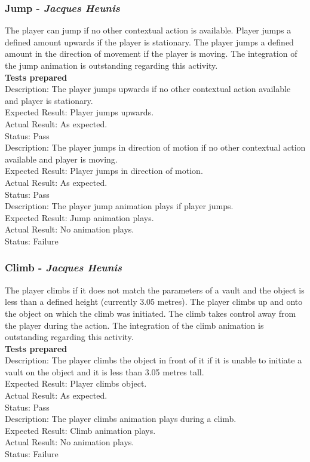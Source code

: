\documentclass[a4paper,10pt]{article}
\begin{document}
\subsubsection{Jump - \textit{Jacques Heunis}}
The player can jump if no other contextual action is available. Player jumps a defined amount upwards if the player is stationary. The player jumps a defined amount in the direction of movement if the player is moving. The integration of the  jump animation is outstanding regarding this activity.
\smallskip\\\textbf{Tests prepared}\\
Description: The player jumps upwards if no other contextual action available and player is stationary. \\
Expected Result: Player jumps upwards.\\
Actual Result:  As expected.\\
Status: Pass
\smallskip\\
Description: The player jumps in direction of motion if no other contextual action available and player is moving. \\
Expected Result: Player jumps in direction of motion.\\
Actual Result: As expected.\\
Status: Pass
\smallskip\\
Description: The player jump animation plays if player jumps. \\
Expected Result: Jump animation plays.\\
Actual Result:  No animation plays.\\
Status: Failure
\subsubsection{Climb - \textit{Jacques Heunis}}
The player climbs if it does not match the parameters of a vault and the object is less than a defined height (currently 3.05 metres). The player climbs up and onto the object on which the climb was initiated. The climb takes control away from the player during the action. The integration of the climb animation is outstanding regarding this activity.\smallskip\\\textbf{Tests prepared}\\
Description: The player climbs the object in front of it if it is unable to initiate a vault on the object and it is less than 3.05 metres tall. \\
Expected Result: Player climbs object.\\
Actual Result: As expected.\\
Status: Pass
\smallskip\\
Description: The player climbs animation plays during a climb. \\
Expected Result: Climb animation plays.\\
Actual Result:  No animation plays.\\
Status: Failure
\end{document}
